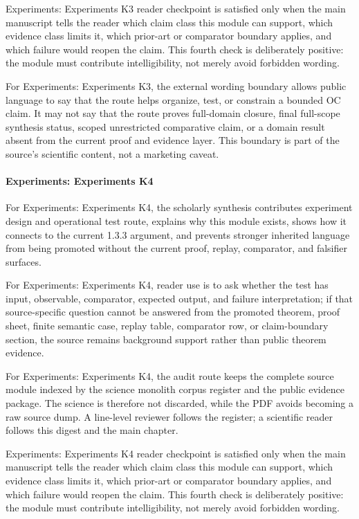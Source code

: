 Experiments: Experiments K3 reader checkpoint is satisfied only when the main manuscript tells the reader which claim class this module can support, which evidence class limits it, which prior-art or comparator boundary applies, and which failure would reopen the claim. This fourth check is deliberately positive: the module must contribute intelligibility, not merely avoid forbidden wording.


For Experiments: Experiments K3, the external wording boundary allows public language to say that the route helps organize, test, or constrain a bounded OC claim. It may not say that the route proves full-domain closure, final full-scope synthesis status, scoped unrestricted comparative claim, or a domain result absent from the current proof and evidence layer. This boundary is part of the source's scientific content, not a marketing caveat.


\paragraph{Experiments: Experiments K4}

For Experiments: Experiments K4, the scholarly synthesis contributes experiment design and operational test route, explains why this module exists, shows how it connects to the current 1.3.3 argument, and prevents stronger inherited language from being promoted without the current proof, replay, comparator, and falsifier surfaces.


For Experiments: Experiments K4, reader use is to ask whether the test has input, observable, comparator, expected output, and failure interpretation; if that source-specific question cannot be answered from the promoted theorem, proof sheet, finite semantic case, replay table, comparator row, or claim-boundary section, the source remains background support rather than public theorem evidence.


For Experiments: Experiments K4, the audit route keeps the complete source module indexed by the science monolith corpus register and the public evidence package. The science is therefore not discarded, while the PDF avoids becoming a raw source dump. A line-level reviewer follows the register; a scientific reader follows this digest and the main chapter.


Experiments: Experiments K4 reader checkpoint is satisfied only when the main manuscript tells the reader which claim class this module can support, which evidence class limits it, which prior-art or comparator boundary applies, and which failure would reopen the claim. This fourth check is deliberately positive: the module must contribute intelligibility, not merely avoid forbidden wording.


